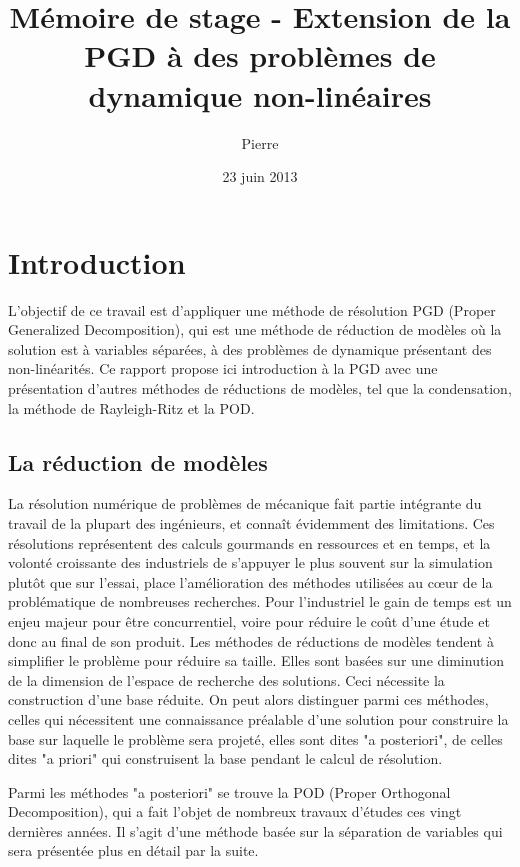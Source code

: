 \documentclass[12pt,a4paper]{report}
\title{Mémoire de stage - Extension de la PGD à des problèmes de dynamique non-linéaires}
\author{Pierre \bsc{Nargil}}
\date{23 juin 2013}
\begin{document}
%


\renewcommand{\contentsname}{Sommaire}
\tableofcontents
\renewcommand{\lstlistingname}{Code source}

  \setlength{\parskip}{0.2cm}
  \setlength{\leftskip}{1cm}
  \setlength{\rightskip}{1cm}

\chapter{Introduction}
L'objectif de ce travail est d'appliquer une méthode de résolution PGD (Proper Generalized Decomposition), qui est une méthode de réduction de modèles où la solution est à variables séparées, à des problèmes de dynamique présentant des non-linéarités. Ce rapport propose ici introduction à la PGD avec une présentation d'autres méthodes de réductions de modèles, tel que la condensation, la méthode de Rayleigh-Ritz et la POD.

\section{La réduction de modèles}
La résolution numérique de problèmes de mécanique fait partie intégrante du travail de la plupart des ingénieurs, et connaît évidemment des limitations. Ces résolutions représentent des calculs gourmands en ressources et en temps, et la volonté croissante des industriels de s'appuyer le plus souvent sur la simulation plutôt que sur l'essai, place l'amélioration des méthodes utilisées au cœur de la problématique de nombreuses recherches. Pour l'industriel le gain de temps est un enjeu majeur pour être concurrentiel, voire pour réduire le coût d'une étude et donc au final de son produit. Les méthodes de réductions de modèles tendent à simplifier le problème pour réduire sa taille. Elles sont basées sur une diminution de la dimension de l'espace de recherche des solutions. Ceci nécessite la construction d'une
base réduite. On peut alors distinguer parmi ces méthodes, celles qui nécessitent une connaissance préalable d'une solution pour construire la base sur laquelle le problème sera projeté, elles sont dites "a posteriori", de celles dites "a priori" qui construisent la base pendant le calcul de résolution. 

Parmi les méthodes "a posteriori" se trouve la POD (Proper Orthogonal Decomposition), qui a fait l'objet de nombreux travaux d'études ces vingt dernières années. Il s'agit d'une méthode basée sur la séparation de variables qui sera présentée plus en détail par la suite. 
\end{document}
